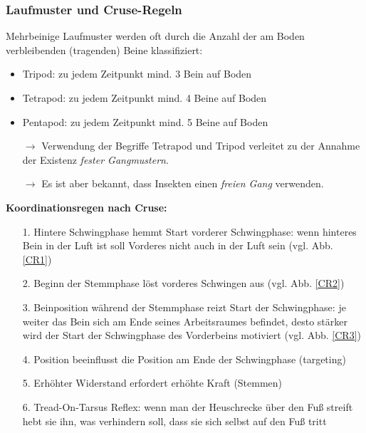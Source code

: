 \subsubsection{Laufmuster und Cruse-Regeln}
\label{LM und CR}
Mehrbeinige Laufmuster werden oft durch die Anzahl der
am Boden verbleibenden (tragenden) Beine klassifiziert:
\begin{itemize}
\item Tripod: zu jedem Zeitpunkt mind. 3 Bein auf Boden
\item Tetrapod: zu jedem Zeitpunkt mind. 4 Beine auf Boden
\item Pentapod: zu jedem Zeitpunkt mind. 5 Beine auf Boden
\item[$\rightarrow$] Verwendung der Begriffe Tetrapod und Tripod
verleitet zu der Annahme der Existenz \textit{fester Gangmustern}.
\item[$\rightarrow$] Es ist aber bekannt, dass Insekten einen \textit{freien
Gang} verwenden.
\end{itemize}
\textbf{Koordinationsregen nach Cruse:}
\begin{itemize}
\item[1.] Hintere Schwingphase hemmt Start vorderer Schwingphase: wenn hinteres Bein in der Luft ist soll Vorderes nicht auch in der Luft sein (vgl. Abb. \ref{CR1})
\item[2.] Beginn der Stemmphase löst vorderes Schwingen aus (vgl. Abb. \ref{CR2})
\item[3.] Beinposition während der Stemmphase reizt Start der Schwingphase: je weiter das Bein sich am Ende seines Arbeitsraumes befindet, desto stärker wird der Start der Schwingphase des Vorderbeins motiviert (vgl. Abb. \ref{CR3})
\item[4.] Position beeinflusst die Position am Ende der Schwingphase (\glqq targeting\grqq)
\item[5.] Erhöhter Widerstand erfordert erhöhte Kraft (Stemmen)
\item[6.] Tread-On-Tarsus Reflex: wenn man der Heuschrecke über den Fuß streift hebt sie ihn, was verhindern soll, dass sie sich selbst auf den Fuß tritt
\end{itemize}
